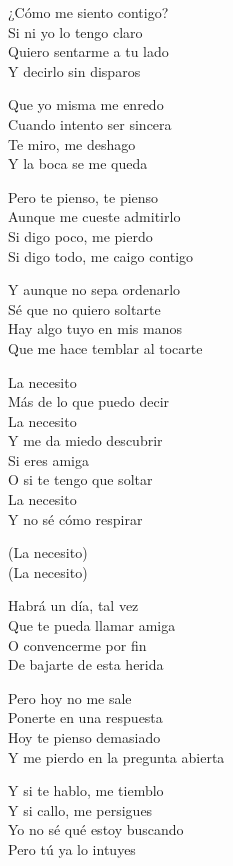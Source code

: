 \begin{lyrics}

¿Cómo me siento contigo?\\
Si ni yo lo tengo claro\\
Quiero sentarme a tu lado\\
Y decirlo sin disparos

Que yo misma me enredo\\
Cuando intento ser sincera\\
Te miro, me deshago\\
Y la boca se me queda

Pero te pienso, te pienso\\
Aunque me cueste admitirlo\\
Si digo poco, me pierdo\\
Si digo todo, me caigo contigo

Y aunque no sepa ordenarlo\\
Sé que no quiero soltarte\\
Hay algo tuyo en mis manos\\
Que me hace temblar al tocarte

La necesito\\
Más de lo que puedo decir\\
La necesito\\
Y me da miedo descubrir\\
Si eres amiga\\
O si te tengo que soltar\\
La necesito\\
Y no sé cómo respirar

(La necesito)\\
(La necesito)

Habrá un día, tal vez\\
Que te pueda llamar amiga\\
O convencerme por fin\\
De bajarte de esta herida

Pero hoy no me sale\\
Ponerte en una respuesta\\
Hoy te pienso demasiado\\
Y me pierdo en la pregunta abierta

Y si te hablo, me tiemblo\\
Y si callo, me persigues\\
Yo no sé qué estoy buscando\\
Pero tú ya lo intuyes


\end{lyrics}
